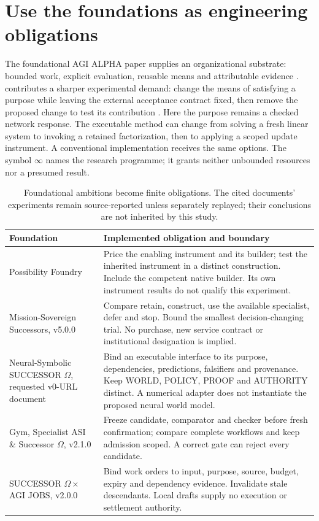 \section{Use the foundations as engineering obligations}

The foundational AGI ALPHA paper supplies an organizational substrate: bounded work, explicit evaluation,
reusable means and attributable evidence \citep{foundation_agialphaunifiedpublicationfinal}.
\TI{} contributes a sharper experimental demand: change the means of satisfying a purpose while leaving
the external acceptance contract fixed, then remove the proposed change to test its contribution
\citep{foundation_transformationalintelligence}. Here the purpose remains a checked network response.
The executable method can change from solving a fresh linear system to invoking a retained factorization,
then to applying a scoped update instrument. A conventional implementation receives the same options.
The symbol $\infty$ names the research programme; it grants neither unbounded resources nor a presumed result.

\begin{table}[ht]\centering\small
\begin{tabularx}{\linewidth}{L{37mm}Y}
\toprule
Foundation & Implemented obligation and boundary \\
\midrule
Possibility Foundry \citep{foundation_possibilityfoundryv1} & Price the enabling instrument and its builder; test the inherited instrument in a distinct construction. Include the competent native builder. Its own instrument results do not qualify this experiment. \\
Mission-Sovereign Successors, v5.0.0 \citep{foundation_missionsovereignsuccessorsv500a4} & Compare retain, construct, use the available specialist, defer and stop. Bound the smallest decision-changing trial. No purchase, new service contract or institutional designation is implied. \\
Neural-Symbolic SUCCESSOR $\Omega$, requested v0-URL document \citep{foundation_neuralsymbolicsuccessoromegav0} & Bind an executable interface to its purpose, dependencies, predictions, falsifiers and provenance. Keep WORLD, POLICY, PROOF and AUTHORITY distinct. A numerical adapter does not instantiate the proposed neural world model. \\
Gym, Specialist ASI \& Successor $\Omega$, v2.1.0 \citep{foundation_goalosgymspecialistasisuccessoromegav210usletter} & Freeze candidate, comparator and checker before fresh confirmation; compare complete workflows and keep admission scoped. A correct gate can reject every candidate. \\
SUCCESSOR $\Omega\times$ AGI JOBS, v2.0.0 \citep{foundation_successoromegaxagijobsv2} & Bind work orders to input, purpose, source, budget, expiry and dependency evidence. Invalidate stale descendants. Local drafts supply no execution or settlement authority. \\
\bottomrule
\end{tabularx}
\caption{Foundational ambitions become finite obligations. The cited documents' experiments remain source-reported unless separately replayed; their conclusions are not inherited by this study.}
\end{table}

